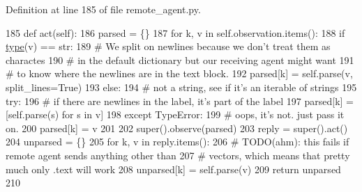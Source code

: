Definition at line 185 of file remote\+\_\+agent.\+py.


\begin{DoxyCode}
185     \textcolor{keyword}{def }act(self):
186         parsed = \{\}
187         \textcolor{keywordflow}{for} k, v \textcolor{keywordflow}{in} self.observation.items():
188             \textcolor{keywordflow}{if} \hyperlink{namespaceparlai_1_1agents_1_1tfidf__retriever_1_1build__tfidf_ad5dfae268e23f506da084a9efb72f619}{type}(v) == str:
189                 \textcolor{comment}{# We split on newlines because we don't treat them as charactes}
190                 \textcolor{comment}{# in the default dictionary but our receiving agent might want}
191                 \textcolor{comment}{# to know where the newlines are in the text block.}
192                 parsed[k] = self.parse(v, split\_lines=\textcolor{keyword}{True})
193             \textcolor{keywordflow}{else}:
194                 \textcolor{comment}{# not a string, see if it's an iterable of strings}
195                 \textcolor{keywordflow}{try}:
196                     \textcolor{comment}{# if there are newlines in the label, it's part of the label}
197                     parsed[k] = [self.parse(s) \textcolor{keywordflow}{for} s \textcolor{keywordflow}{in} v]
198                 \textcolor{keywordflow}{except} TypeError:
199                     \textcolor{comment}{# oops, it's not. just pass it on.}
200                     parsed[k] = v
201 
202         super().observe(parsed)
203         reply = super().act()
204         unparsed = \{\}
205         \textcolor{keywordflow}{for} k, v \textcolor{keywordflow}{in} reply.items():
206             \textcolor{comment}{# TODO(ahm): this fails if remote agent sends anything other than}
207             \textcolor{comment}{# vectors, which means that pretty much only .text will work}
208             unparsed[k] = self.parse(v)
209         \textcolor{keywordflow}{return} unparsed
210 
\end{DoxyCode}
\mbox{\label{classparlai_1_1agents_1_1remote__agent_1_1remote__agent_1_1ParsedRemoteAgent_ae364a1860ec6ff9f32dabc42b96004d0}} 
